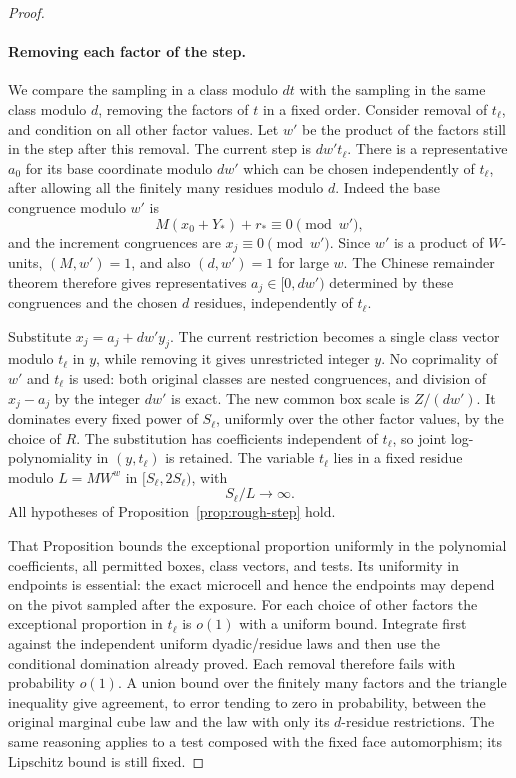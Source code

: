 \begin{proof}
\paragraph{Removing each factor of the step.}
We compare the sampling in a class modulo $dt$ with the sampling
in the same class modulo $d$, removing the factors of $t$ in a
fixed order.  Consider removal of $t_\ell$, and condition on all
other factor values.  Let $w'$ be the product of the factors still
in the step after this removal.  The current step is $dw't_\ell$.
There is a representative $a_0$ for its base coordinate modulo
$dw'$ which can be chosen independently of $t_\ell$, after
allowing all the finitely many residues modulo $d$.
Indeed the base congruence modulo $w'$ is
\begin{equation}\label{eq:alignment-origin-congruence}
 M(x_0+Y_*)+r_*\equiv0\pmod {w'},
\end{equation}
and the increment congruences are $x_j\equiv0\pmod {w'}$.
Since $w'$ is a product of $W$-units,
$(M,w')=1$, and also $(d,w')=1$ for large $w$.
The Chinese remainder theorem therefore gives representatives
$a_j\in[0,dw')$ determined by these congruences and the chosen
$d$ residues, independently of $t_\ell$.

Substitute $x_j=a_j+dw'y_j$.  The current restriction becomes a
single class vector modulo $t_\ell$ in $y$, while removing it gives
unrestricted integer $y$.  No coprimality of $w'$ and $t_\ell$ is
used: both original classes are nested congruences, and division
of $x_j-a_j$ by the integer $dw'$ is exact.
The new common box scale is $Z/(dw')$.  It dominates every fixed
power of $S_\ell$, uniformly over the other factor values, by
the choice of $R$.  The substitution has coefficients independent
of $t_\ell$, so joint log-polynomiality in $(y,t_\ell)$ is retained.
The variable $t_\ell$ lies in a fixed residue modulo $L=MW^w$
in $[S_\ell,2S_\ell)$, with
\[
 S_\ell/L\longrightarrow\infty.
\]
All hypotheses of Proposition~\ref{prop:rough-step} hold.

That Proposition bounds the exceptional proportion uniformly in
the polynomial coefficients, all permitted boxes, class vectors,
and tests.  Its uniformity in endpoints is essential: the exact
microcell and hence the endpoints may depend on the pivot sampled
after the exposure.  For each choice of other factors the
exceptional proportion in $t_\ell$ is $o(1)$ with a uniform bound.
Integrate first against the independent uniform dyadic/residue
laws and then use the conditional domination already proved.
Each removal therefore fails with probability $o(1)$.  A union
bound over the finitely many factors and the triangle inequality
give agreement, to error tending to zero in probability, between
the original marginal cube law and the law with only its
$d$-residue restrictions.  The same reasoning applies to a test
composed with the fixed face automorphism; its Lipschitz bound is
still fixed.


\end{proof}
